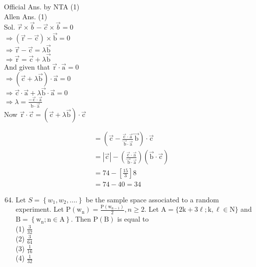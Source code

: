 \documentclass[10pt]{article}
\begin{document}
Official Ans. by NTA (1)\\
Allen Ans. (1)\\
Sol. \(\vec{r} \times \vec{b}-\vec{c} \times \vec{b}=0\)\\
\(\Rightarrow(\overrightarrow{\mathrm{r}}-\overrightarrow{\mathrm{c}}) \times \overrightarrow{\mathrm{b}}=0\)\\
\(\Rightarrow \overrightarrow{\mathrm{r}}-\overrightarrow{\mathrm{c}}=\lambda \overrightarrow{\mathrm{b}}\)\\
\(\Rightarrow \overrightarrow{\mathrm{r}}=\overrightarrow{\mathrm{c}}+\lambda \overrightarrow{\mathrm{b}}\)\\
And given that \(\overrightarrow{\mathrm{r}} \cdot \overrightarrow{\mathrm{a}}=0\)\\
\(\Rightarrow(\overrightarrow{\mathrm{c}}+\lambda \overrightarrow{\mathrm{b}}) \cdot \overrightarrow{\mathrm{a}}=0\)\\
\(\Rightarrow \overrightarrow{\mathrm{c}} \cdot \overrightarrow{\mathrm{a}}+\lambda \overrightarrow{\mathrm{b}} \cdot \overrightarrow{\mathrm{a}}=0\)\\
\(\Rightarrow \lambda=\frac{-\overrightarrow{\mathrm{c}} \cdot \overrightarrow{\mathrm{a}}}{\dot{\mathrm{b}} \cdot \overrightarrow{\mathrm{a}}}\)\\
Now \(\overrightarrow{\mathrm{r}} \cdot \overrightarrow{\mathrm{c}}=(\overrightarrow{\mathrm{c}}+\lambda \overrightarrow{\mathrm{b}}) \cdot \overrightarrow{\mathrm{c}}\)

\[
\begin{aligned}
& =\left(\overrightarrow{\mathrm{c}}-\frac{\overrightarrow{\mathrm{c}} \cdot \overrightarrow{\mathrm{a}}}{\overrightarrow{\mathrm{~b}} \cdot \overrightarrow{\mathrm{a}}} \overrightarrow{\mathrm{~b}}\right) \cdot \overrightarrow{\mathrm{c}} \\
& =|\overrightarrow{\mathrm{c}}|-\left(\frac{\overrightarrow{\mathrm{c}} \cdot \overrightarrow{\mathrm{a}}}{\overrightarrow{\mathrm{~b}} \cdot \overrightarrow{\mathrm{a}}}\right)(\overrightarrow{\mathrm{b}} \cdot \overrightarrow{\mathrm{c}}) \\
& =74-\left[\frac{15}{3}\right] 8 \\
& =74-40=34
\end{aligned}
\]

\begin{enumerate}
  \setcounter{enumi}{63}
  \item Let \(S=\left\{w_{1}, w_{2}, \ldots.\right\}\) be the sample space associated to a random experiment. Let \(\mathrm{P}\left(\mathrm{w}_{\mathrm{n}}\right)=\frac{\mathrm{P}\left(\mathrm{w}_{\mathrm{n}-1}\right)}{2}, n \geq 2\). Let \(\mathrm{A}=\{2 \mathrm{k}+3 \ell ; \mathrm{k}, \ell \in \mathrm{N}\}\) and \(\mathrm{B}=\left\{\mathrm{w}_{\mathrm{n}} ; \mathrm{n} \in \mathrm{A}\right\}\). Then \(\mathrm{P}(\mathrm{B})\) is equal to\\
(1) \(\frac{3}{32}\)\\
(2) \(\frac{3}{64}\)\\
(3) \(\frac{1}{16}\)\\
(4) \(\frac{1}{32}\)
\end{enumerate}
\end{document}
